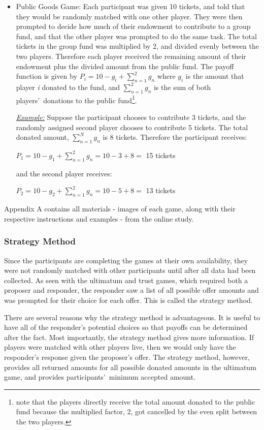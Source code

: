 \documentclass[12pt]{article}
\begin{document}
\begin{itemize}
\item{Public Goods Game}: Each participant was given 10 tickets, and told that they would be randomly matched with one other player. They were then prompted to decide how much of their endowment to contribute to a group fund, and that the other player was prompted to do the same task. The total tickets in the group fund was multiplied by 2, and divided evenly between the two players. Therefore each player received the remaining amount of their endowment plus the divided amount from the public fund. The payoff function is given by \( P_{i} = 10 - g_{i} + \sum_{n=1}^{2} g_{n} \) where \(g_{i}\) is the amount that player \textit{i} donated to the fund, and \(\sum_{n=1}^{2}g_{n}\) is the sum of both players\rq \ donations to the public fund\footnote{note that the players directly receive the total amount donated to the public fund because the multiplied factor, 2, got cancelled by the even split between the two players.}.

\subitem \underline{\textit{Example:}} Suppose the participant chooses to contribute 3 tickets, and the randomly assigned second player chooses to contribute 5 tickets. The total donated amount, \(\sum_{n=1}^{N} g_{n}\) is 8 tickets. Therefore the participant receives: 

\( P_{1} = 10 - g_{1} +  \sum_{n=1}^{2} g_{n} = 10 - 3 + 8 = \) 15 tickets 

and the second player receives: 

\( P_{2} = 10 - g_{2} +  \sum_{n=1}^{2} g_{n} = 10 - 5 + 8 = \) 13 tickets 


\end{itemize}

Appendix A contains all materials - images of each game, along with their respective instructions and examples - from the online study.

\subsubsection{Strategy Method}

Since the participants are completing the games at their own availability, they were not randomly matched with other participants until after all data had been collected. As seen with the ultimatum and trust games, which required both a proposer and responder, the responder saw a list of all possible offer amounts and was prompted for their choice for each offer. This is called the strategy method.

There are several reasons why the strategy method is advantageous. It is useful to have all of the responder\rq s potential choices so that payoffs can be determined after the fact. Most importantly, the strategy method gives more information. If players were matched with other players live, then we would only have the responder\rq s response given the proposer\rq s offer. The strategy method, however, provides all returned amounts for all possible donated amounts in the ultimatum game, and provides participants\rq \ minimum accepted amount. 
\end{document}

